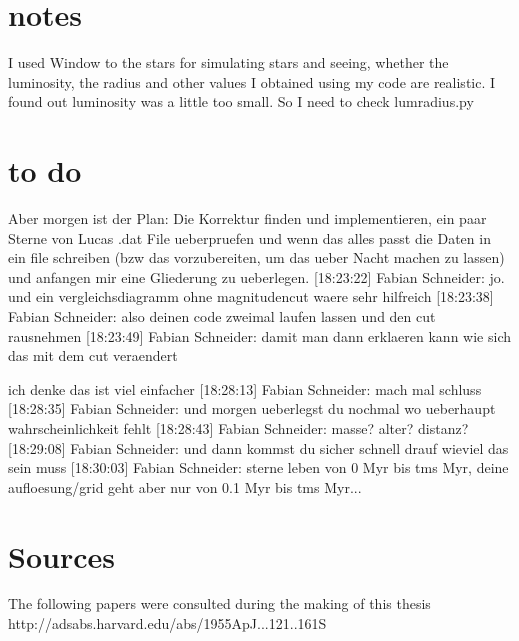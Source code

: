 \documentclass[a4paper,10pt]{article}
\date{11/21/14}
\begin{document}
 \section{notes}
 I used Window to the stars for simulating stars and seeing, whether the luminosity, the radius and other values 
 I obtained using my code are realistic. I found out luminosity was a little too small. So I need to check lumradius.py

 \section{to do}
 Aber morgen ist der Plan: Die Korrektur finden und implementieren, ein paar Sterne von Lucas .dat File ueberpruefen 
 und wenn das alles passt die Daten in ein file schreiben (bzw das vorzubereiten, um das ueber Nacht machen zu lassen) 
 und anfangen mir eine Gliederung zu ueberlegen.
[18:23:22] Fabian Schneider: jo. und ein vergleichsdiagramm ohne magnitudencut waere sehr hilfreich
[18:23:38] Fabian Schneider: also deinen code zweimal laufen lassen und den cut rausnehmen
[18:23:49] Fabian Schneider: damit man dann erklaeren kann wie sich das mit dem cut veraendert


			    ich denke das ist viel einfacher
[18:28:13] Fabian Schneider: mach mal schluss
[18:28:35] Fabian Schneider: und morgen ueberlegst du nochmal wo ueberhaupt wahrscheinlichkeit fehlt
[18:28:43] Fabian Schneider: masse? alter? distanz?
[18:29:08] Fabian Schneider: und dann kommst du sicher schnell drauf wieviel das sein muss
[18:30:03] Fabian Schneider: sterne leben von 0 Myr bis tms Myr, deine aufloesung/grid geht aber nur von 0.1 Myr bis tms Myr...

 
 \section{Sources}
 The following papers were consulted during the making of this thesis
 http://adsabs.harvard.edu/abs/1955ApJ...121..161S
\end{document}
